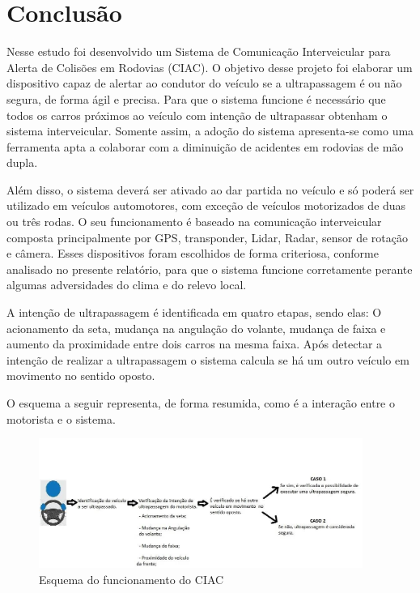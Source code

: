 \chapter[Conclusão]{Conclusão}

Nesse estudo foi desenvolvido um Sistema de Comunicação Interveicular para Alerta
de Colisões em Rodovias (CIAC). O objetivo desse projeto foi elaborar um dispositivo
capaz de alertar ao condutor do veículo se a ultrapassagem é ou não segura, de
forma ágil e precisa. Para que o sistema funcione é necessário que todos os
carros próximos ao veículo com intenção de ultrapassar obtenham o sistema
interveicular. Somente assim, a adoção do sistema apresenta-se como uma
ferramenta apta a colaborar com a diminuição de acidentes em rodovias de
mão dupla.

Além disso, o sistema deverá ser ativado ao dar partida no veículo e só
 poderá ser utilizado em veículos automotores, com exceção de veículos
 motorizados de duas ou três rodas. O seu funcionamento é baseado na
 comunicação interveicular composta principalmente por GPS, transponder,
 Lidar, Radar, sensor de rotação e câmera. Esses dispositivos foram escolhidos
 de forma criteriosa, conforme analisado no presente relatório, para que o
 sistema funcione corretamente perante algumas adversidades do clima e do
 relevo local.

A intenção de ultrapassagem é identificada em quatro etapas, sendo elas: O
acionamento da seta, mudança na angulação do volante, mudança de faixa e aumento
da proximidade entre dois carros na mesma faixa. Após detectar a intenção de
realizar a ultrapassagem o sistema calcula se há um outro veículo em movimento
no sentido oposto.

O esquema a seguir representa, de forma resumida, como é a interação entre o
motorista e o sistema.

\begin{figure}[h]
  \centering
  \includegraphics[width=400px, scale=1]{figuras/funcionamentociac}
  \caption{Esquema do funcionamento do CIAC}
\label{fig:funcionamentociac}
\end{figure}

